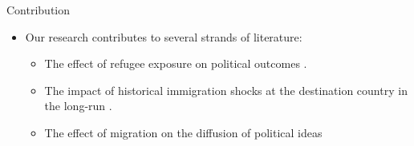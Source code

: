 \documentclass[aspectratio=169]{beamer}
\begin{document}
\begin{frame}{Contribution}




\begin{itemize}
    \item Our research contributes to several strands of literature:
    \begin{itemize}
        \item The effect of refugee exposure on political outcomes \textcolor{gray}{\citep{halla_immigration_2017, dustmann_refugee_2018,hangartner_refugee_2019, edo_immigration_2019, steinmayr_contact_2021, alesina_political_2024}}. %
        \item The impact of historical immigration shocks at the destination country in the long-run \textcolor{gray}{\citep{tabellini_gifts_2020, schindler_shocking_2021,bursztyn_immigrant_2024, chevalier_forced_2024, ochsner_activated_2024, toews_enemies_2025}}. %
        \item The effect of migration on the diffusion of political ideas \textcolor{gray}{\citep{spilimbergo_democracy_2009, barsbai_effect_2017,dippel_leadership_2021, calderon_racial_2023, bazzi_confederate_2023}}   %
    \end{itemize}
\end{itemize}





\end{frame}
\end{document}
